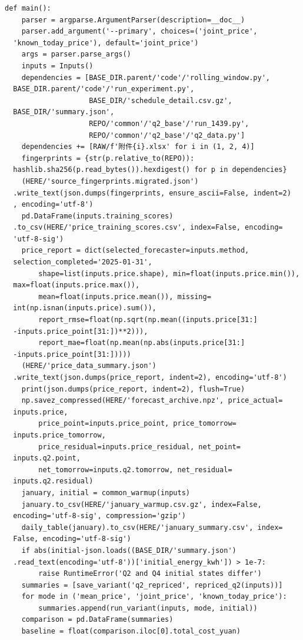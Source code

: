 \begin{verbatim}
def main():
    parser = argparse.ArgumentParser(description=__doc__)
    parser.add_argument('--primary', choices=('joint_price',
  'known_today_price'), default='joint_price')
    args = parser.parse_args()
    inputs = Inputs()
    dependencies = [BASE_DIR.parent/'code'/'rolling_window.py',
  BASE_DIR.parent/'code'/'run_experiment.py',
                    BASE_DIR/'schedule_detail.csv.gz',
  BASE_DIR/'summary.json',
                    REPO/'common'/'q2_base'/'run_1439.py',
                    REPO/'common'/'q2_base'/'q2_data.py']
    dependencies += [RAW/f'附件{i}.xlsx' for i in (1, 2, 4)]
    fingerprints = {str(p.relative_to(REPO)):
  hashlib.sha256(p.read_bytes()).hexdigest() for p in dependencies}
    (HERE/'source_fingerprints.migrated.json')
  .write_text(json.dumps(fingerprints, ensure_ascii=False, indent=2)
  , encoding='utf-8')
    pd.DataFrame(inputs.training_scores)
  .to_csv(HERE/'price_training_scores.csv', index=False, encoding=
  'utf-8-sig')
    price_report = dict(selected_forecaster=inputs.method,
  selection_completed='2025-01-31',
        shape=list(inputs.price.shape), min=float(inputs.price.min()),
  max=float(inputs.price.max()),
        mean=float(inputs.price.mean()), missing=
  int(np.isnan(inputs.price).sum()),
        report_rmse=float(np.sqrt(np.mean((inputs.price[31:]
  -inputs.price_point[31:])**2))),
        report_mae=float(np.mean(np.abs(inputs.price[31:]
  -inputs.price_point[31:]))))
    (HERE/'price_data_summary.json')
  .write_text(json.dumps(price_report, indent=2), encoding='utf-8')
    print(json.dumps(price_report, indent=2), flush=True)
    np.savez_compressed(HERE/'forecast_archive.npz', price_actual=
  inputs.price,
        price_point=inputs.price_point, price_tomorrow=
  inputs.price_tomorrow,
        price_residual=inputs.price_residual, net_point=
  inputs.q2.point,
        net_tomorrow=inputs.q2.tomorrow, net_residual=
  inputs.q2.residual)
    january, initial = common_warmup(inputs)
    january.to_csv(HERE/'january_warmup.csv.gz', index=False,
  encoding='utf-8-sig', compression='gzip')
    daily_table(january).to_csv(HERE/'january_summary.csv', index=
  False, encoding='utf-8-sig')
    if abs(initial-json.loads((BASE_DIR/'summary.json')
  .read_text(encoding='utf-8'))['initial_energy_kwh']) > 1e-7:
        raise RuntimeError('Q2 and Q4 initial states differ')
    summaries = [save_variant('q2_repriced', repriced_q2(inputs))]
    for mode in ('mean_price', 'joint_price', 'known_today_price'):
        summaries.append(run_variant(inputs, mode, initial))
    comparison = pd.DataFrame(summaries)
    baseline = float(comparison.iloc[0].total_cost_yuan)

\end{verbatim}
